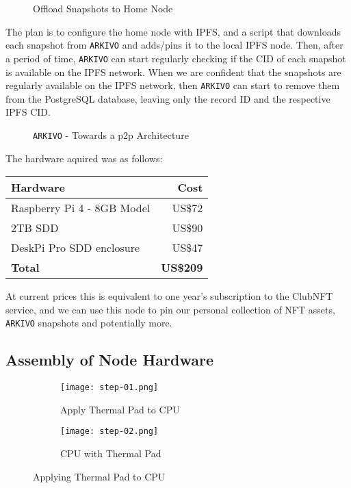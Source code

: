 \begin{figure}[h]
    \centering
    
    \caption[Offload Snapshots to Home Node]{Offload Snapshots to Home Node}
    \label{fig:offload-snapshots}
\end{figure}

The plan is to configure the home node with IPFS, and a script that downloads each snapshot from \texttt{ARKIVO} and adds/pins it to the local IPFS node. Then, after a period of time, \texttt{ARKIVO} can start regularly checking if the CID of each snapshot is available on the IPFS network. When we are confident that the snapshots are regularly available on the IPFS network, then \texttt{ARKIVO} can start to remove them from the PostgreSQL database, leaving only the record ID and the respective IPFS CID.


\begin{figure}[h]
    \centering
    
    \caption[\texttt{ARKIVO} - Towards a p2p Architecture]{\texttt{ARKIVO} - Towards a p2p Architecture}
    \label{fig:offload-snapshots}
\end{figure}


The hardware aquired was as follows:

\begin{table}[H]
\footnotesize
\centering
\begin{tabular}{|l|r|}
\hline
\textbf{Hardware}          & \textbf{Cost}    \\ \hline
Raspberry Pi 4 - 8GB Model & US\$72           \\ \hline
2TB SDD                    & US\$90           \\ \hline
DeskPi Pro SDD enclosure   & US\$47           \\ \hline
\textbf{Total}             & \textbf{US\$209} \\ \hline
\end{tabular}
\end{table}

At current prices this is equivalent to one year's subscription to the ClubNFT service, and we can use this node to pin our personal collection of NFT assets, \texttt{ARKIVO} snapshots and potentially more.


\subsection{Assembly of Node Hardware}


\begin{figure}[H]
  \centering
  \begin{subfigure}[b]{0.45\textwidth}
    \centering
    \texttt{[image: step-01.png]}
    \caption{Apply Thermal Pad to CPU}
    \label{fig:step-01}
  \end{subfigure}
  \hfill
  \begin{subfigure}[b]{0.45\textwidth}
    \centering
    \texttt{[image: step-02.png]}
    \caption{CPU with Thermal Pad}
    \label{fig:step-02.png}
  \end{subfigure}
  \caption{Applying Thermal Pad to CPU}
  \label{fig:node-steps-01-02}
\end{figure}


